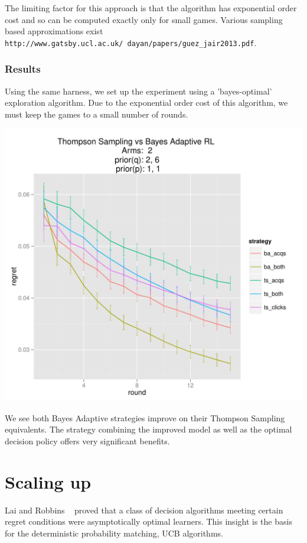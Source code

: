\documentclass[11pt,a4,singlespacing,titlepagenumber=on]{scrreprt}
\numberwithin{equation}{chapter} %
\theoremstyle{remark}
\begin{document}
The limiting factor for this approach is that the algorithm has exponential order cost and so can be computed exactly only for small games. Various sampling based approximations exist \texttt{http://www.gatsby.ucl.ac.uk/~dayan/papers/guez\_jair2013.pdf}. 

\subsection{Results}

Using the same harness, we set up the experiment using a 'bayes-optimal' exploration algorithm. Due to the exponential order cost of this algorithm, we must keep the games to a small number of rounds. 

\includegraphics[scale=0.9]{TSvsBARL.pdf}

We see both Bayes Adaptive strategies improve on their Thompson Sampling equivalents. The strategy combining the improved model as well as the optimal decision policy offers very significant benefits.







\chapter{Scaling up}
Lai and Robbins ~\cite{lai1985asymptotically} proved that a class of decision algorithms meeting certain regret conditions were asymptotically optimal learners. This insight is the basis for the deterministic probability matching, UCB algorithms. 
\end{document}
